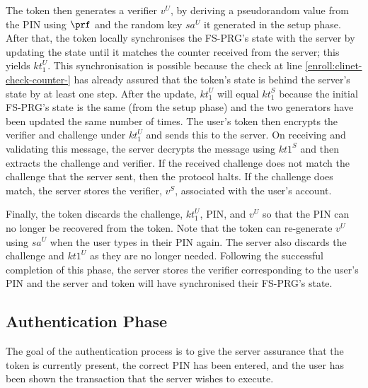 \documentclass[runningheads]{llncs}
\newcommand{\sss}{\scriptscriptstyle}
\newcommand{\keyt}{\ensuremath{{kt}}}
\newcommand{\salt}{\ensuremath{{sa}}}
\renewcommand{\verifier}{\ensuremath{{v}}}
\newcommand{\VC}[1]{\ensuremath{#1^{\sss U}}}
\newcommand{\VS}[1]{\ensuremath{#1^{\sss S}}}
\begin{document}
The token then generates a verifier $\VC{\verifier}$, by deriving a pseudorandom value from the PIN using $\prf$ and the random key $\VC{\salt}$ it generated in the setup phase.  After that, the token locally synchronises the FS-PRG's state with the server by updating the state until it matches the counter received from the server; this yields \VC{\keyt_{\sss 1}}. This synchronisation is possible because the check at line \ref{enroll:clinet-check-counter-} has already assured that the token's state is behind the server's state by at least one step. After the update, \VC{\keyt_{\sss 1}} will equal \VS{\keyt_{\sss 1}} because the initial FS-PRG's state is the same (from the setup phase) and the two generators have been updated the same number of times. The user's token then encrypts the verifier and challenge under \VC{\keyt_{\sss 1}} and sends this to the server. 
On receiving and validating this message, the server decrypts the message using \VS{\keyt{\sss 1}} and then extracts the challenge and verifier.
If the received challenge does not match the challenge that the server sent, then the protocol halts.
If the challenge does match, the server stores the verifier, $\VS{\verifier}$,  associated with the user's account.

Finally, the token discards the challenge, \VC{\keyt_{\sss 1}}, PIN, and \VC{\verifier} so that the PIN can no longer be recovered from the token. Note that the token can re-generate \VC{\verifier} using \VC{\salt} when the user types in their PIN again. The server also discards the challenge and \VC{\keyt{\sss 1}} as they are no longer needed. Following the successful completion of this phase, the server stores the verifier corresponding to the user's PIN and the server and token will have synchronised their FS-PRG's state.

\subsection{Authentication Phase}
\label{sec:authentication}

The goal of the authentication process is to give the server assurance that the token is currently present, the correct PIN has been entered, and the user has been shown the transaction that the server wishes to execute.


\end{document}
